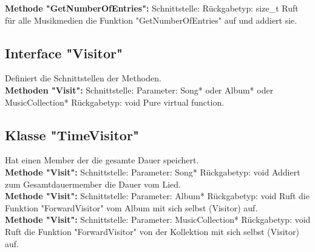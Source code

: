\documentclass[12pt,a4paper]{article}
\begin{document}
\textbf {Methode "GetNumberOfEntries": } 
\newline
Schnittstelle:
\newline
Rückgabetyp: size\_t
\newline
Ruft für alle Musikmedien die Funktion "GetNumberOfEntries" auf und addiert sie.
\\

\subsection {Interface "Visitor"}
Definiert die Schnittstellen der Methoden.
\\

\textbf {Methoden "Visit": } 
\newline
Schnittstelle: 
\newline
Parameter: Song* oder Album* oder MusicCollection*
\newline
Rückgabetyp: void
\newline
Pure virtual function.
\\

\subsection {Klasse "TimeVisitor"}
Hat einen Member der die gesamte Dauer speichert.
\\

\textbf {Methode "Visit": } 
\newline
Schnittstelle: 
\newline
Parameter: Song*
\newline
Rückgabetyp: void
\newline
Addiert zum Gesamtdauermember die Dauer vom Lied.
\\

\textbf {Methode "Visit": } 
\newline
Schnittstelle: 
\newline
Parameter: Album*
\newline
Rückgabetyp: void
\newline
Ruft die Funktion "ForwardVisitor" vom Album mit sich selbst (Visitor) auf.
\\

\textbf {Methode "Visit": } 
\newline
Schnittstelle: 
\newline
Parameter: MusicCollection*
\newline
Rückgabetyp: void
\newline
Ruft die Funktion "ForwardVisitor" von der Kollektion mit sich selbst (Visitor) auf.
\\
\end{document}
